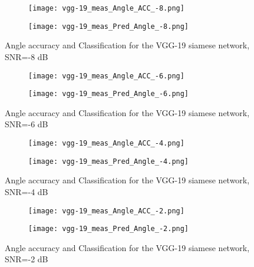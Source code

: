   \begin{figure}[htbp]
    \centering
    \begin{subfigure}{.5\textwidth}
      \centering
      \texttt{[image: vgg-19\_meas\_Angle\_ACC\_-8.png]}
    \end{subfigure}%
    \begin{subfigure}{.5\textwidth}
      \centering
      \texttt{[image: vgg-19\_meas\_Pred\_Angle\_-8.png]}
    \end{subfigure}
    \caption{Angle accuracy and Classification for the VGG-19 siamese network, SNR=-8 dB}
    \label{fig:vgg-19_snr2}
  \end{figure}

  \begin{figure}[htbp]
    \centering
    \begin{subfigure}{.5\textwidth}
      \centering
      \texttt{[image: vgg-19\_meas\_Angle\_ACC\_-6.png]}
    \end{subfigure}%
    \begin{subfigure}{.5\textwidth}
      \centering
      \texttt{[image: vgg-19\_meas\_Pred\_Angle\_-6.png]}
    \end{subfigure}
    \caption{Angle accuracy and Classification for the VGG-19 siamese network, SNR=-6 dB}
    \label{fig:vgg-19_snr3}
  \end{figure}

  \begin{figure}[htbp]
    \centering
    \begin{subfigure}{.5\textwidth}
      \centering
      \texttt{[image: vgg-19\_meas\_Angle\_ACC\_-4.png]}
    \end{subfigure}%
    \begin{subfigure}{.5\textwidth}
      \centering
      \texttt{[image: vgg-19\_meas\_Pred\_Angle\_-4.png]}
    \end{subfigure}
    \caption{Angle accuracy and Classification for the VGG-19 siamese network, SNR=-4 dB}
    \label{fig:vgg-19_snr4}
  \end{figure}

  \begin{figure}[htbp]
    \centering
    \begin{subfigure}{.5\textwidth}
      \centering
      \texttt{[image: vgg-19\_meas\_Angle\_ACC\_-2.png]}
    \end{subfigure}%
    \begin{subfigure}{.5\textwidth}
      \centering
      \texttt{[image: vgg-19\_meas\_Pred\_Angle\_-2.png]}
    \end{subfigure}
    \caption{Angle accuracy and Classification for the VGG-19 siamese network, SNR=-2 dB}
    \label{fig:vgg-19_snr5}
  \end{figure}


